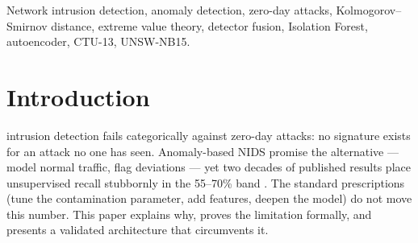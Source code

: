 \documentclass[journal]{IEEEtran}
\begin{document}
\begin{abstract}
($\hat\xi = 1.12$, infinite variance) yields calibrated false-positive rates
where percentile thresholds overshoot by $3.8\times$. The resulting two-stage
architecture --- fused zero-day net, gradient-boosted known-attack classifier,
and a zero-day candidate queue --- achieves $F_1=0.945$ on CTU-13 with 87\%
false-positive reduction. In a controlled simulation withholding four attack
families from the classifier entirely, the dual-head pipeline raises end-to-end
zero-day routing of Backdoor from 5.0\% to 27.8\% and Analysis from 2.2\% to
23.8\%, with zero-day queue precision of 86.7\%; of all hidden-family flows
flagged by Stage~1, fewer than 1\% are cleared as benign --- the remainder
reach an analyst either through the queue or as (family-misattributed) attack
alerts.
\end{abstract}

\begin{IEEEkeywords}
Network intrusion detection, anomaly detection, zero-day attacks,
Kolmogorov--Smirnov distance, extreme value theory, detector fusion,
Isolation Forest, autoencoder, CTU-13, UNSW-NB15.
\end{IEEEkeywords}

\section{Introduction}
 intrusion detection fails categorically
against zero-day attacks: no signature exists for an attack no one has seen.
Anomaly-based NIDS promise the alternative --- model normal traffic, flag
deviations --- yet two decades of published results place unsupervised recall
stubbornly in the 55--70\% band \cite{garcia2014,moustafa2016}. The standard
prescriptions (tune the contamination parameter, add features, deepen the
model) do not move this number. This paper explains why, proves the limitation
formally, and presents a validated architecture that circumvents it.
\end{document}
